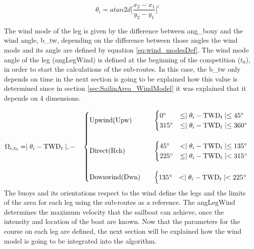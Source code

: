 \begin{equation} \label{eq:bouy_angle}
    \theta_{{i}}=atan2d \bigg [\frac{x_{2}-x_{1}}{y_{2}-y_{1}} \bigg] ^{i}
\end{equation}

The wind mode of the leg is given by the difference between %
\acrshort{ang_bouy} %
and the wind angle, %
\acrshort{b_tw}, depending on the difference between those angles the wind mode and its angle are defined by equation \ref{eq:wind_modesDef}. The wind mode angle of the leg (\acrshort{angLegWind}) is defined at the beginning of the competition (\textit{$t_{0}$}), in order to start the calculations of the sub-routes. In this case, %
the \acrshort{b_tw} only depends on time in the next section is going to be explained how this value is determined since in section \ref{sec:SailinArea_WindModel} it was explained that it depends on 4 dimensions.\par 
\begin{equation} \label{eq:wind_modesDef}
\Omega_{i,t_{0}} = \mid \theta_{i}-\textrm{TWD}_{t} \mid,
- \quad 
    \begin{cases}
        \text{Upwind(Upw)} \quad &
            \begin{cases}
                0\degree  &\leq  \mid \theta_{i}-\textrm{TWD}_{t} \mid    \leq    45\degree \\
                315\degree  &\leq    \mid \theta_{i}-\textrm{TWD}_{t} \mid  \leq   360\degree \\
            \end{cases} \\ 
    \\
        \text{Direct(Rch)}\quad &
            \begin{cases}
                45\degree   &<     \mid \theta_{i}-\textrm{TWD}_{t} \mid \leq   135\degree \\
                225\degree &\leq \mid \theta_{i}-\textrm{TWD}_{t} \mid <  315\degree \\
            \end{cases}\\
    \\
        \text{Downwind(Dwn)}\quad &
            \begin{cases}
                135\degree &<  \mid \theta_{i}-\textrm{TWD}_{t} \mid <  225\degree \\
            \end{cases}
            
    \end{cases}\\
\end{equation}
The buoys and its orientations respect to the wind define the legs and the limits of the area for each leg using the sub-routes as a reference. The \acrfull{angLegWind} determines the maximum velocity that the sailboat can achieve, once the intensity and location of the boat are known.  Now that the parameters for the course on each leg are defined, the next section will be explained how the wind model is going to be integrated into the algorithm. \par 

